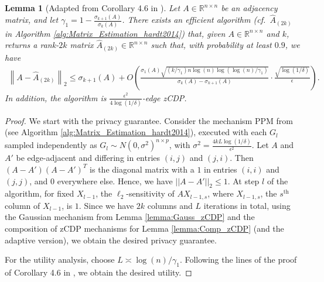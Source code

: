 \documentclass{article}
\newtheorem{lemma}{Lemma}
\begin{document}
\begin{lemma}[Adapted from Corollary 4.6 in \cite{hardt2014noisy}]
\label{lemma:hardt2014_conc_bound}
Let $A \in \mathbb{R}^{n \times n}$ be an adjacency matrix, and let $\gamma_1 = 1 - \frac{\sigma_{k + 1}(A)}{\sigma_k(A)}$. There exists an efficient algorithm (cf.\ $\hat{A}_{(2k)}$ in Algorithm \ref{alg:Matrix_Estimation_hardt2014}) that, given $A \in \mathbb{R}^{n \times n}$ and $k$, returns a rank-$2k$ matrix $\hat{A}_{(2k)} \in \mathbb{R}^{n \times n}$ such that, with probability at least $0.9$, we have
\begin{align*}
    \left\|A - \hat{A}_{(2k)}\right\|_2 \leq \sigma_{k + 1}(A) + O\left(\frac{\sigma_1(A)\sqrt{(k/\gamma_1)n\log(n)\log(\log(n)/\gamma_1)}}{\sigma_k(A) - \sigma_{k + 1}(A)}\cdot \frac{\sqrt{\log(1/\delta)}}{\epsilon}\right).
\end{align*}
In addition, the algorithm is $\frac{\epsilon^2}{4\log(1/\delta)}$-edge zCDP.
\end{lemma}
\begin{proof}
We start with the privacy guarantee. Consider the mechanism PPM from \cite{hardt2014noisy} (see Algorithm \ref{alg:Matrix_Estimation_hardt2014}), executed with each $G_{l}$ sampled independently as $G_l \sim N(0, \sigma^2)^{n \times p}$, with $\sigma^2 = \frac{4kL\log(1/\delta)}{\epsilon^2}$. Let $A$ and $A'$ be edge-adjacent and differing in entries $(i, j)$ and $(j, i)$. Then $(A - A')(A - A')^T$ is the diagonal matrix with a $1$ in entries $(i, i)$ and $(j, j)$, and $0$ everywhere else. Hence, we have $||A - A'||_2 \leq 1$. At step $l$ of the algorithm, for fixed $X_{l - 1}$, the $\ell_2$-sensitivity of $AX_{l - 1, s}$, where $X_{l - 1, s}$, the $s^{\text{th}}$ column of $X_{l - 1}$, is $1$. Since we have $2k$ columns and $L$ iterations in total, using the Gaussian mechanism from Lemma \ref{lemma:Gauss_zCDP} and the composition of zCDP mechanisms for Lemma \ref{lemma:Comp_zCDP} (and the adaptive version), we obtain the desired privacy guarantee.

For the utility analysis, choose $L \asymp \log(n)/\gamma_1$. Following the lines of the proof of Corollary 4.6 in \cite{hardt2014noisy}, we obtain the desired utility.
\end{proof}
\end{document}
